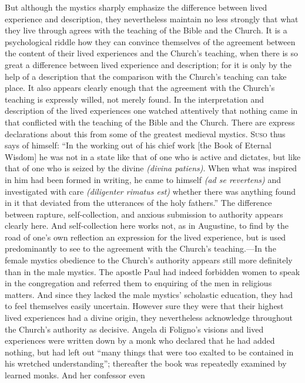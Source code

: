 \documentclass[12pt,a4paper]{book}
\newcommand{\opage}[1]{\marginnote{\footnotesize\textit{[#1]}}}
\begin{document}
But although the mystics sharply emphasize the difference between lived experience and description,
they nevertheless maintain no less strongly that what they live through agrees with the teaching of
the Bible and the Church. It is a psychological riddle how they can convince themselves of the
agreement between the content of their lived experiences and the Church's teaching, when there is so
great a difference between lived experience and description; for it is only by the help of a
description that the comparison with the Church's teaching can take place. It also appears clearly
enough 
\opage{118}that the agreement with the Church's teaching is expressly willed, not merely found. In the
interpretation and description of the lived experiences one watched attentively that nothing came in
that conflicted with the teaching of the Bible and the Church. There are express declarations about
this from some of the greatest medieval mystics. \textsc{Suso} thus says of himself: ``In the working
out of his chief work [the Book of Eternal Wisdom] he was not in a state like that of one who is
active and dictates, but like that of one who is seized by the divine \emph{(divina patiens)}. When
what was inspired in him had been formed in writing, he came to himself \emph{(ad se revertens)} and
investigated with care \emph{(diligenter rimatus est)} whether there was anything found in it that
deviated from the utterances of the holy fathers.'' The difference between rapture, self-collection,
and anxious submission to authority appears clearly here. And self-collection here works not, as in
Augustine, to find by the road of one's own reflection an expression for the lived experience, but is
used predominantly to see to the agreement with the Church's teaching.---In the female mystics
obedience to the Church's authority appears still more definitely than in the male mystics. The
apostle Paul had indeed forbidden women to speak in the congregation and referred them to enquiring
of the men in religious matters. And since they lacked the male mystics' scholastic education, they
had to feel themselves easily uncertain. However sure they were that their highest lived experiences
had a divine origin, they nevertheless acknowledge throughout the Church's authority as decisive.
Angela di Foligno's visions and lived experiences were written down by a monk who declared that he had
added nothing, but had left out ``many things that were too exalted to be contained in his wretched
understanding''; thereafter the book was repeatedly examined by learned monks. And her confessor even
\end{document}
